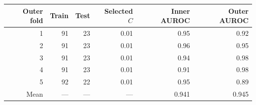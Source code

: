 \begin{tabular}{rrrrrr}
\toprule
Outer fold & Train & Test & Selected $C$ & Inner AUROC & Outer AUROC \\
\midrule
1 & 91 & 23 & 0.01 & 0.95 & 0.92 \\
2 & 91 & 23 & 0.01 & 0.96 & 0.95 \\
3 & 91 & 23 & 0.01 & 0.94 & 0.98 \\
4 & 91 & 23 & 0.01 & 0.91 & 0.98 \\
5 & 92 & 22 & 0.01 & 0.95 & 0.89 \\
Mean & --- & --- & --- & 0.941 & 0.945 \\
\bottomrule
\end{tabular}
